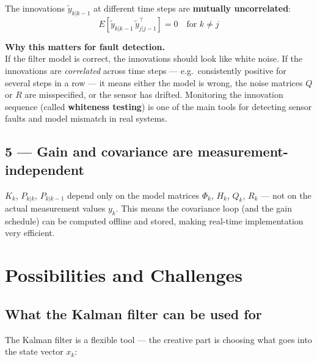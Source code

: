 \documentclass[12pt, a4paper]{article}
\begin{document}
The innovations $\tilde{y}_{k|k-1}$ at different time steps are
\textbf{mutually uncorrelated}:
\[
  E\!\left[\tilde{y}_{k|k-1}\,\tilde{y}_{j|j-1}^\top\right] = 0
  \quad \text{for } k \neq j
\]

\begin{notebox}
  \textbf{Why this matters for fault detection.}\\
  If the filter model is correct, the innovations should look like
  white noise.
  If the innovations are \emph{correlated} across time steps ---
  e.g.\ consistently positive for several steps in a row --- it
  means either the model is wrong, the noise matrices $Q$ or $R$
  are misspecified, or the sensor has drifted.
  Monitoring the innovation sequence (called \textbf{whiteness
  testing}) is one of the main tools for detecting sensor faults
  and model mismatch in real systems.
\end{notebox}

\subsection*{5 --- Gain and covariance are measurement-independent}

$K_k$, $P_{k|k}$, $P_{k|k-1}$ depend only on the model matrices
$\Phi_k$, $H_k$, $Q_k$, $R_k$ --- not on the actual measurement
values $y_k$.
This means the covariance loop (and the gain schedule) can be
computed offline and stored, making real-time implementation very
efficient.

\clearpage
\section*{Possibilities and Challenges}

\subsection*{What the Kalman filter can be used for}

The Kalman filter is a flexible tool --- the creative part is
choosing what goes into the state vector $x_k$:
\end{document}
